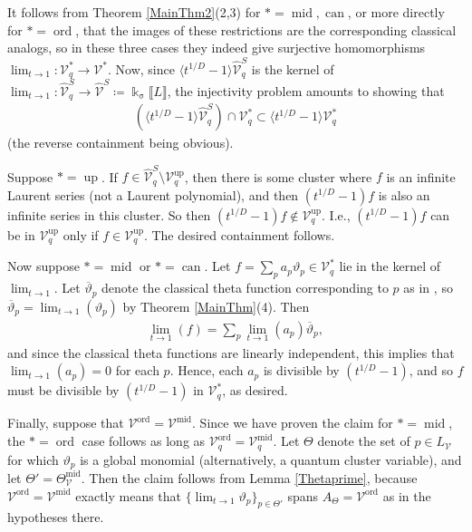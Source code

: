 \documentclass{amsart}
\DeclareMathOperator{\up}{up}
\DeclareMathOperator{\midd}{mid}
\DeclareMathOperator{\ord}{ord}
\DeclareMathOperator{\can}{can}
\let\?=\overline
\let\llb=\llbracket
\let\rrb=\rrbracket
\let\rar=\rightarrow
\let\s=\mathcal
\let\wh=\widehat
\newcommand {\kk} {\Bbbk}
\renewcommand{\sigma}{\upsigma}
\theoremstyle{plain}%
\theoremstyle{definition}
\theoremstyle{remark}
\newenvironment{myproof}[1][\proofname]{\proof[#1]\mbox{}}{\endproof}
\begin{document}
\begin{myproof}[Proof of Theorem \ref{flat}]
It follows from Theorem \ref{MainThm2}(2,3) for $*=\midd,\can$, or more directly for $*=\ord$, that the images of these restrictions are the corresponding classical analogs, so in these three cases they indeed give surjective homomorphisms $\lim_{t\rar 1}\colon \s{V}_q^*\rar \s{V}^*$.  Now, since $\langle t^{1/D}-1\rangle\wh{\s{V}}_q^S$ is the kernel of $\lim_{t\rar 1}\colon \wh{\s{V}}_q^S\rar \wh{\s{V}}^S\coloneqq \kk_{\sigma}\llb L\rrb$, the injectivity problem amounts to showing that
\begin{align*}
    \left(\langle t^{1/D}-1\rangle\wh{\s{V}}_q^S\right)\cap \s{V}_q^* \subset \langle t^{1/D}-1\rangle\s{V}_q^*
\end{align*}
(the reverse containment being obvious).

Suppose $*=\up$.  If $f\in \wh{\s{V}}_q^S\setminus \s{V}_q^{\up}$, then there is some cluster where $f$ is an infinite Laurent series (not a Laurent polynomial), and then $(t^{1/D}-1)f$ is also an infinite series in this cluster.  So then $(t^{1/D}-1)f\notin \s{V}_q^{\up}$.  I.e., $(t^{1/D}-1)f$ can be in $\s{V}_q^{\up}$ only if $f\in \s{V}_q^{\up}$. The desired containment follows.

Now suppose $*=\midd$ or $*=\can$.  Let $f=\sum_p a_p\vartheta_p\in \s{V}_q^*$  lie in the kernel of $\lim_{t\rightarrow 1}$.  Let $\?{\vartheta}_p$ denote the classical theta function corresponding to $p$ as in \cite{GHKK}, so $\?{\vartheta}_p=\lim_{t\rar 1}(\vartheta_p)$ by Theorem \ref{MainThm}(4).  Then 
\begin{align*}
    \lim_{t\rar 1} (f)=\sum_p \lim_{t\rar 1}(a_p) \?{\vartheta}_p,
\end{align*}
and since the classical theta functions are linearly independent, this implies that $\lim_{t\rar 1}(a_p)=0$ for each $p$.  Hence, each $a_p$ is divisible by $(t^{1/D}-1)$, and so $f$ must be divisible by $(t^{1/D}-1)$ in $\s{V}_q^{*}$, as desired.

Finally, suppose that $\s{V}^{\ord}=\s{V}^{\midd}$.  Since we have proven the claim for $*=\midd$, the $*=\ord$ case follows as long as $\s{V}_q^{\ord}=\s{V}_q^{\midd}$.  Let $\Theta$ denote the set of $p\in L_{\s{V}}$ for which $\vartheta_p$ is a global monomial (alternatively, a quantum cluster variable), and let $\Theta'=\Theta_{\s{V}}^{\midd}$.  Then the claim follows from Lemma \ref{Thetaprime}, because $\s{V}^{\ord}=\s{V}^{\midd}$ exactly means that $\{\lim_{t\rar 1}\vartheta_p\}_{p\in \Theta'}$ spans $A_{\Theta}=\s{V}^{\ord}$ as in the hypotheses there.
\end{myproof}
\end{document}

